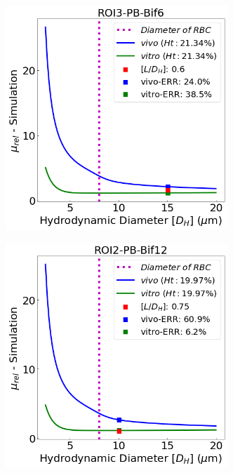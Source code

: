 \begin{figure}[H]
\begin{subfigure}{0.45 \textwidth}
    \includegraphics[width=0.92\textwidth]{images/DeviationsViscosity2.png}
    \caption{\textit{} \label{DeviationsViscosity2}}
\end{subfigure}
\hfill
\begin{subfigure}{0.45 \textwidth}
    \includegraphics[width=0.92\textwidth]{images/DeviationsViscosity3.png}

\end{subfigure}
\end{figure}
